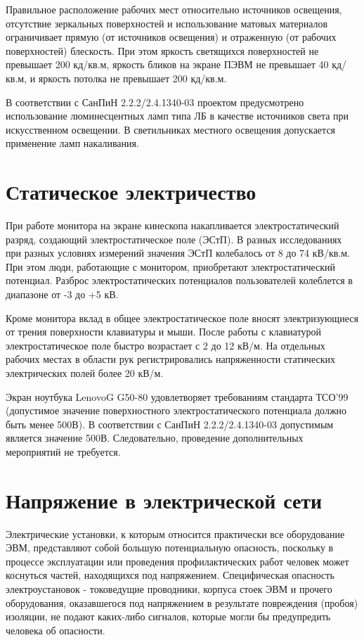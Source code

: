 Правильное расположение рабочих мест относительно источников освещения, отсутствие зеркальных поверхностей и использование матовых материалов ограничивает прямую (от источников освещения) и отраженную (от рабочих
поверхностей) блескость. При этом яркость светящихся поверхностей не превышает 200 кд/кв.м, яркость бликов на экране ПЭВМ не превышает 40 кд/кв.м, и яркость потолка не превышает 200 кд/кв.м.

В соответствии с СанПиН 2.2.2/2.4.1340-03 проектом предусмотрено использование люминесцентных ламп типа ЛБ в качестве источников света при искусственном освещении. В светильниках местного освещения допускается применение ламп накаливания.


\section{Статическое электричество}
При работе монитора на экране кинескопа накапливается электростатический разряд, создающий электростатическое поле (ЭСтП). В разных исследованиях при разных условиях измерений значения ЭСтП колебалось от 8 до 74 кВ/кв.м. При этом люди, работающие с монитором, приобретают электростатический потенциал. Разброс электростатических потенциалов пользователей колеблется в диапазоне от -3 до +5 кВ.

Кроме монитора вклад в общее электростатическое поле вносят электризующиеся от трения поверхности клавиатуры и мыши. После работы с клавиатурой электростатическое поле быстро возрастает с 2 до 12 кВ/м. На отдельных рабочих местах в области рук регистрировались напряженности статических электрических полей более 20 кВ/м.

Экран ноутбука LenovoG G50-80 удовлетворяет требованиям стандарта ТСО’99 (допустимое значение поверхностного электростатического потенциала должно быть менее 500В). В соответствии с СанПиН 2.2.2/2.4.1340-03 допустимым является значение 500В. Следовательно, проведение дополнительных мероприятий не требуется.


\section{Напряжение в электрической сети}
Электрические установки, к которым относится практически все оборудование ЭВМ, представляют собой большую потенциальную опасность, поскольку в процессе эксплуатации или проведения профилактических работ человек может коснуться частей, находящихся под напряжением. Специфическая опасность электроустановок - токоведущие проводники, корпуса стоек ЭВМ и прочего оборудования, оказавшегося под напряжением в результате повреждения (пробоя) изоляции, не подают каких-либо сигналов, которые могли бы предупредить человека об опасности.

